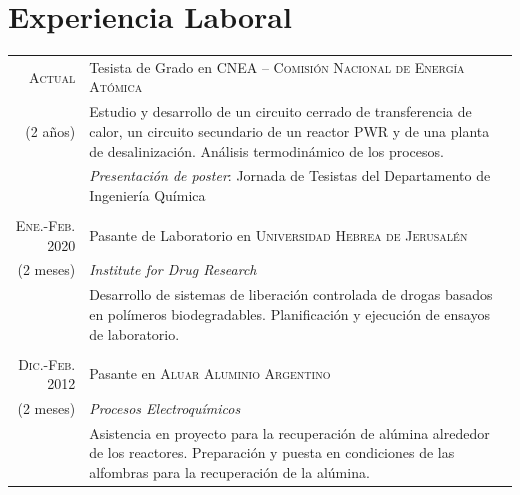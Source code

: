 \documentclass[a4paper,10pt]{article}
\begin{document}
\section{Experiencia Laboral}\smallskip
\begin{tabular}{r|p{11cm}}
\textsc{Actual}&Tesista de Grado en \textsc{CNEA -- Comisión Nacional de Energía Atómica}  \\(2 años)&\footnotesize{Estudio y desarrollo de un circuito cerrado de transferencia de calor, un circuito secundario de un reactor PWR y de una planta de desalinización. Análisis termodinámico de los procesos.}
 \\&\footnotesize{\emph{Presentación de poster}: Jornada de Tesistas del Departamento de Ingeniería Química}\\\multicolumn{2}{c}{} \\

\textsc{Ene.-Feb. 2020} & Pasante de Laboratorio en \textsc{Universidad Hebrea de Jerusalén}\\(2 meses) & \emph{Institute for Drug Research}\\&\footnotesize{Desarrollo de sistemas de liberación controlada de drogas basados en polímeros biodegradables. Planificación y ejecución de ensayos de laboratorio.}\\\multicolumn{2}{c}{}\\
 
\textsc{Dic.-Feb. 2012} & Pasante en \textsc{Aluar Aluminio Argentino}\\(2 meses)& \emph{Procesos Electroquímicos}\\&\footnotesize{Asistencia en proyecto para la recuperación de alúmina alrededor de los reactores. Preparación y puesta en condiciones de las alfombras para la recuperación de la alúmina.}
\end{tabular}\smallskip
\end{document}
